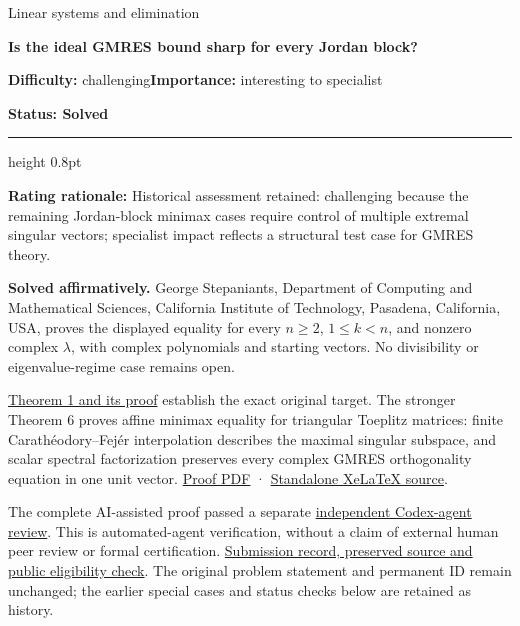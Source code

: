 \documentclass[11pt,a4paper]{article}
\makeatletter
\renewcommand{\subsection}{\Needspace{4\baselineskip}\@startsection{subsection}{2}{0pt}{9pt plus 1pt minus 1pt}{3pt}{\sffamily\bfseries\normalsize\color{ink}}}
\makeatother
\begin{document}
{\sffamily\small\color{muted}Linear systems and elimination\par}
\vspace{3pt}
{\raggedright{}\sffamily\bfseries\fontsize{21}{24}\selectfont\color{ink}Is
the ideal GMRES bound sharp for every Jordan block?\par}
\vspace{7pt}
{\sffamily\small\textbf{Difficulty:} challenging\quad\textbf{Importance:} interesting
to specialist\par}
{\sffamily\small\bfseries\color{accent}Status: Solved\par}
\vspace{4pt}
{\color{accent}\hrule height 0.8pt}
\vspace{6pt}
\textbf{Rating rationale:} Historical assessment retained: challenging
because the remaining Jordan-block minimax cases require control of
multiple extremal singular vectors; specialist impact reflects a
structural test case for GMRES theory.

\subsection{Resolution --- 2026-09-11}\label{resolution-2026-09-11}

\textbf{Solved affirmatively.} George Stepaniants, Department of
Computing and Mathematical Sciences, California Institute of Technology,
Pasadena, California, USA, proves the displayed equality for every
\(n\ge2\), \(1\le k<n\), and nonzero complex \(\lambda\), with complex
polynomials and starting vectors. No divisibility or eigenvalue-regime
case remains open.

\href{https://github.com/ajt60gaibb/OpenProblemsInNLA/blob/main/linear-systems-and-elimination/IE-02/solution.md}{Theorem
1 and its proof} establish the exact original target. The stronger
Theorem 6 proves affine minimax equality for triangular Toeplitz
matrices: finite Carathéodory--Fejér interpolation describes the maximal
singular subspace, and scalar spectral factorization preserves every
complex GMRES orthogonality equation in one unit vector.
\href{https://github.com/ajt60gaibb/OpenProblemsInNLA/blob/main/linear-systems-and-elimination/IE-02/solution.pdf}{Proof
PDF} ·
\href{https://github.com/ajt60gaibb/OpenProblemsInNLA/blob/main/linear-systems-and-elimination/IE-02/solution.tex}{Standalone
XeLaTeX source}.

The complete AI-assisted proof passed a separate
\href{https://github.com/ajt60gaibb/OpenProblemsInNLA/blob/main/references/stepaniants-ie02-2026-09-11/verification/IE-02-independent-review.md}{independent
Codex-agent review}. This is automated-agent verification, without a
claim of external human peer review or formal certification.
\href{https://github.com/ajt60gaibb/OpenProblemsInNLA/blob/main/references/stepaniants-ie02-2026-09-11/README.md}{Submission
record, preserved source and public eligibility check}. The original
problem statement and permanent ID remain unchanged; the earlier special
cases and status checks below are retained as history.
\end{document}
